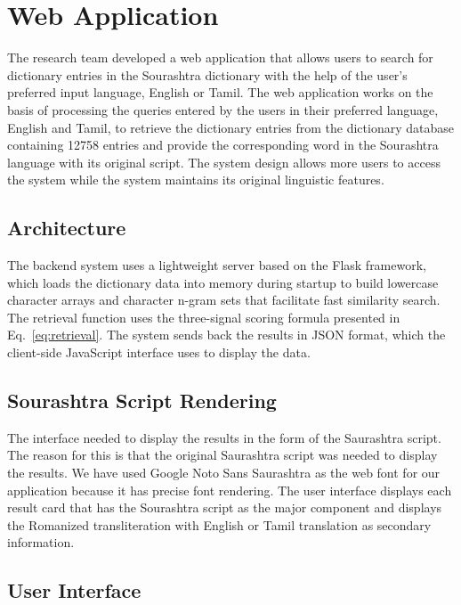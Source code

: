 \documentclass[conference]{IEEEtran}
\begin{document}
\section{Web Application}\label{sec:webapp}

The research team developed a web application that allows users to search for dictionary entries in the Sourashtra dictionary with the help of the user's preferred input language, English or Tamil. The web application works on the basis of processing the queries entered by the users in their preferred language, English and Tamil, to retrieve the dictionary entries from the dictionary database containing 12758 entries and provide the corresponding word in the Sourashtra language with its original script. The system design allows more users to access the system while the system maintains its original linguistic features.

\subsection{Architecture}

The backend system uses a lightweight server based on the Flask framework, which loads the dictionary data into memory during startup to build lowercase character arrays and character n-gram sets that facilitate fast similarity search. The retrieval function uses the three-signal scoring formula presented in Eq.~\ref{eq:retrieval}. The system sends back the results in JSON format, which the client-side JavaScript interface uses to display the data.

\subsection{Sourashtra Script Rendering}

The interface needed to display the results in the form of the Saurashtra script. The reason for this is that the original Saurashtra script was needed to display the results. We have used Google Noto Sans Saurashtra as the web font for our application because it has precise font rendering. The user interface displays each result card that has the Sourashtra script as the major component and displays the Romanized transliteration with English or Tamil translation as secondary information.

\subsection{User Interface}
\end{document}

